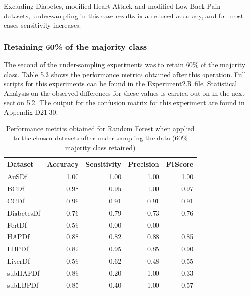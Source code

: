 Excluding Diabetes, modified Heart Attack and modified Low Back Pain datasets, under-sampling in this case results in a reduced accuracy, and for most cases sensitivity increases. 


\subsubsection{Retaining 60\% of the majority class}
The second of the under-sampling experiments was to retain 60\% of the majority class. Table 5.3 shows the performance metrics obtained after this operation. Full scripts for this experiments can be found in the Experiment2.R file.
Statistical Analysis on the observed differences for these values is carried out on in the next section 5.2.
The output for the confusion matrix for this experiment are found in Appendix D21-30.

\begin{table}[ht]
\centering
\begin{tabular}{lrrrr}
  \hline
  \rowcolor{LightCyan}
Dataset & Accuracy & Sensitivity & Precision & F1Score \\ 
  \hline
AuSDf & 1.00 & 1.00 & 1.00 & 1.00 \\ 
  BCDf & 0.98 & 0.95 & 1.00 & 0.97 \\ 
  CCDf & 0.99 & 0.91 & 0.91 & 0.91 \\ 
  DiabetesDf & 0.76 & 0.79 & 0.73 & 0.76 \\ 
  FertDf & 0.59 & 0.00 & 0.00 &  \\ 
  HAPDf & 0.88 & 0.82 & 0.88 & 0.85 \\ 
  LBPDf & 0.82 & 0.95 & 0.85 & 0.90 \\ 
  LiverDf & 0.59 & 0.62 & 0.48 & 0.55 \\ 
  subHAPDf & 0.89 & 0.20 & 1.00 & 0.33 \\ 
  subLBPDf & 0.85 & 0.40 & 1.00 & 0.57 \\ 
   \hline
\end{tabular}
\caption{Performance metrics obtained for Random Forest when applied to the chosen datasets after under-sampling the data (60\% majority class retained)}
\end{table}

